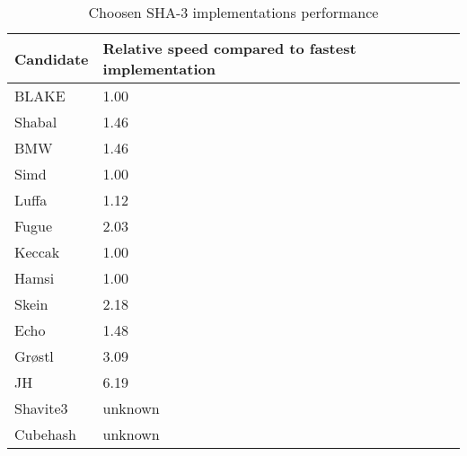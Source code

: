\begin{table}
  \centering
  \begin{tabular}{ | l | p{6cm} }
    \hline
    \textbf{Candidate} & \textbf{Relative speed compared to fastest implementation} & \\ \hline
     BLAKE      & 1.00                     \\ \hline
     Shabal     & 1.46                     \\ \hline
     \ac{BMW}   & 1.46                     \\ \hline
     Simd       & 1.00                     \\ \hline
     Luffa      & 1.12                     \\ \hline
     Fugue      & 2.03                     \\ \hline
     Keccak     & 1.00                     \\ \hline
     Hamsi      & 1.00                     \\ \hline
     Skein      & 2.18                     \\ \hline
     Echo       & 1.48                     \\ \hline
     Grøstl     & 3.09                     \\ \hline
     JH         & 6.19                     \\ \hline
     Shavite3   & unknown                  \\ \hline
     Cubehash   & unknown                  \\ \hline
  \end{tabular}
  \caption{Choosen \ac{SHA}-3 implementations performance}
  \label{tbl:sha3:speedrelative}
\end{table}
